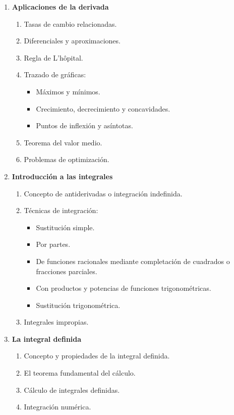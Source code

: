 \begin{enumerate}
\item \textbf{Aplicaciones de la derivada}
\begin{enumerate}[$a)$]
\item Tasas de cambio relacionadas.
\item Diferenciales y aproximaciones.
\item Regla de L'hôpital.
\item Trazado de gráficas:
    \begin{itemize}
        \item Máximos y mínimos.
        \item Crecimiento, decrecimiento y concavidades.
        \item Puntos de inflexión y asíntotas.
    \end{itemize}
\item Teorema del valor medio.
\item Problemas de optimización.
\end{enumerate}

\item \textbf{Introducción a las integrales}
\begin{enumerate}[$a)$]
\item Concepto de antiderivadas o integración indefinida.
\item Técnicas de integración:
    \begin{itemize}
        \item Sustitución simple.
        \item Por partes.
        \item De funciones racionales mediante completación de cuadrados o fracciones parciales.
        \item Con productos y potencias de funciones trigonométricas.
        \item Sustitución trigonométrica.
    \end{itemize}
\item Integrales impropias.
\end{enumerate}

\item \textbf{La integral definida}
\begin{enumerate}[$a)$]
\item Concepto y propiedades de la integral definida.
\item El teorema fundamental del cálculo.
\item Cálculo de integrales definidas.
\item Integración numérica.
\end{enumerate}


\end{enumerate}
